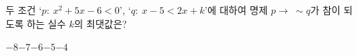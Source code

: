두 조건 `$p:\ x^2+5x-6<0$', `$q:\ x-5<2x+k$'에 대하여 명제 $p\longrightarrow\ \sim q$가 참이 되도록 하는 실수 $k$의 최댓값은?
\begin{choices32}{$-8$}{$-7$}{$-6$}{$-5$}{$-4$}\end{choices32}
